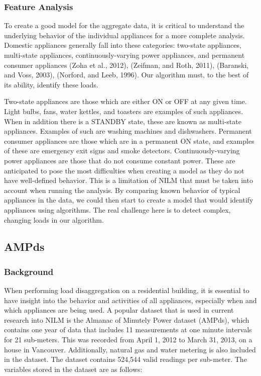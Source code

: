 \documentclass[12pt,twocolumn]{article}
\begin{document}
			\subsubsection*{Feature Analysis}
			\quad To create a good model for the aggregate data, it is critical to understand the underlying behavior of the individual appliances for a more complete analysis. Domestic appliances generally fall into these categories: two-state appliances, multi-state appliances, continuously-varying power appliances, and permanent consumer appliances (Zoha et al., 2012), (Zeifman, and Roth, 2011), (Baranski, and Voss, 2003), (Norford, and Leeb, 1996). Our algorithm must, to the best of its ability, identify these loads. \newline

			Two-state appliances are those which are either ON or OFF at any given time. Light bulbs, fans, water kettles, and toasters are examples of such appliances. When in addition there is a STANDBY state, these are known as multi-state appliances. Examples of such are washing machines and dishwashers. Permanent consumer appliances are those which are in a permanent ON state, and examples of these are emergency exit signs and smoke detectors. Continuously-varying power appliances are those that do not consume constant power. These are anticipated to pose the most difficulties when creating a model as they do not have well-defined behavior. This is a limitation of NILM that must be taken into account when running the analysis. By comparing known behavior of typical appliances in the data, we could then start to create a model that would identify appliances using algorithms. The real challenge here is to detect complex, changing loads in our algorithm. 
			
		\subsection{AMPds}

			\subsubsection*{Background}
				\quad When performing load disaggregation on a residential building, it is essential to have insight into the behavior and activities of all appliances, especially when and which appliances are being used. A popular dataset that is used in current research into NILM is the Almanac of Minutely Power dataset (AMPds), which contains one year of data that includes 11 measurements at one minute intervals for 21 sub-meters. This was recorded from April 1, 2012 to March 31, 2013, on a house in Vancouver. Additionally, natural gas and water metering is also included in the dataset. The dataset contains 524,544 valid readings per sub-meter. The variables stored in the dataset are as follows:
\end{document}
